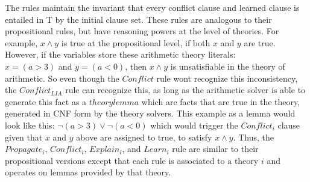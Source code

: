 \documentclass{article}
\begin{document}
The rules maintain the invariant that every conflict clause and learned 
clause is entailed in T by the initial clause set.
These rules are analogous to their propositional rules, but 
have reasoning powers at the level of theories. For example, 
$x \land y$ is true at the propositional level, if both 
$x$ and $y$ are true. However, if the variables store these 
arithmetic theory literals: \\
$x = (a > 3)$ and $y = (a < 0)$, then $x \land y$ is 
unsatisfiable in the theory of arithmetic. So even though 
the $Conflict$ rule wont recognize this inconsistency, 
the $Conflict_{LIA}$ rule can recognize this, as long as 
the arithmetic solver is able to generate this fact as a 
$theory lemma$ which are facts that are true in the theory, 
generated in CNF form by the theory solvers. This example
as a lemma would look like this:
$\neg (a > 3) \lor \neg (a < 0)$ which would trigger the 
$Conflict_i$ clause given that $x$ and $y$ above are assigned 
to true, to satisfy $x \land y$. Thus, the $Propagate_i$, 
$Conflict_i$, $Explain_i$, and $Learn_i$ rule are similar 
to their propositional versions except that each rule is 
associated to a theory $i$ and operates on lemmas 
provided by that theory. 
\end{document}
